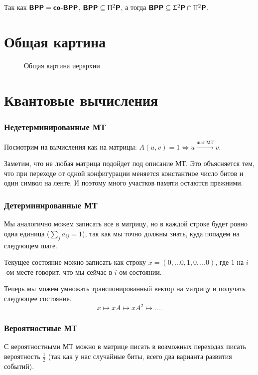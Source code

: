 \begin{note}
	Так как $ \textmd{\textbf{\textsf{BPP}}} = \textmd{\textbf{\textsf{co-BPP}}}$, $ \textmd{\textbf{\textsf{BPP}}} \subseteq \Uppi^2\textmd{\textbf{\textsf{P}}}$, а тогда $ \textmd{\textbf{\textsf{BPP}}} \subseteq \Upsigma^2\textmd{\textbf{\textsf{P}}} \cap \Uppi^2\textmd{\textbf{\textsf{P}}}$.
\end{note}


\section{Общая картина}
\begin{figure}[ht]
    \centering
    \caption{Общая картина иерархии}
    \label{fig:general-picture}
\end{figure}

\section{Квантовые вычисления}
\subsubsection{Недетерминированные МТ}
Посмотрим на вычисления как на матрицы: $ A(u, v) = 1 \Longleftrightarrow u \stackrel{\text{шаг МТ}}{\longrightarrow} v$.

Заметим, что не любая матрица подойдет под описание МТ. Это объясняется тем, что при переходе от одной конфигурации меняется константное число битов и один символ на ленте. И поэтому много участков памяти остаются прежними.

\subsubsection{Детерминированные МТ}
Мы аналогично можем записать все в матрицу, но в каждой строке будет ровно одна единица ($ \sum_{j}^{} a_{ij} = 1$), так как мы точно должны знать, куда попадем на следующем шаге.

Текущее состояние можно записать как строку $ x = (0, \ldots 0, 1, 0, \ldots 0)$, где $ 1$ на $ i$-ом месте говорит, что мы сейчас в $ i$-ом состоянии.

Теперь мы можем умножать транспонированный вектор на матрицу и получать следующее состояние.
\[
x \longmapsto xA \longmapsto xA^2 \longmapsto \ldots 
.\] 

\subsubsection{Вероятностные МТ}
С вероятностными МТ можно в матрице писать в возможных переходах писать вероятность $ \tfrac{1}{2}$ (так как у нас случайные биты, всего два варианта развития событий).

